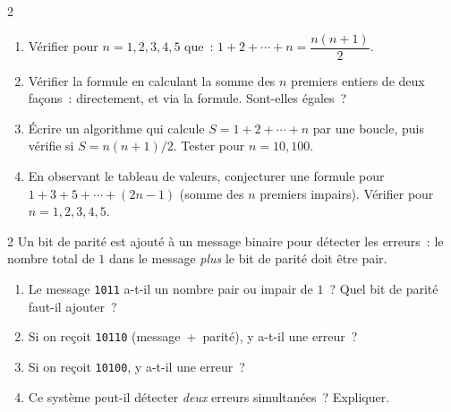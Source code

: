 \begin{probleme}{2}
\begin{enumerate}
  \item V\'erifier pour $n = 1, 2, 3, 4, 5$ que~:
        $1 + 2 + \cdots + n = \dfrac{n(n+1)}{2}.$
  \item V\'erifier la formule en calculant la somme des $n$ premiers entiers
        de deux fa\c cons~: directement, et via la formule.
        Sont-elles \'egales~?
  \item \'Ecrire un algorithme qui calcule $S = 1+2+\cdots+n$ par une boucle,
        puis v\'erifie si $S = n(n+1)/2$. Tester pour $n = 10, 100$.
  \item En observant le tableau de valeurs, conjecturer une formule
        pour $1 + 3 + 5 + \cdots + (2n-1)$ (somme des $n$ premiers impairs).
        V\'erifier pour $n = 1, 2, 3, 4, 5$.
\end{enumerate}
\end{probleme}

\begin{probleme}{2}
Un bit de parit\'e est ajout\'e \`a un message binaire pour d\'etecter les erreurs~:
le nombre total de $1$ dans le message \emph{plus} le bit de parit\'e doit \^etre pair.
\begin{enumerate}
  \item Le message \texttt{1011} a-t-il un nombre pair ou impair de $1$~?
        Quel bit de parit\'e faut-il ajouter~?
  \item Si on re\c coit \texttt{10110} (message~+~parit\'e), y a-t-il une erreur~?
  \item Si on re\c coit \texttt{10100}, y a-t-il une erreur~?
  \item Ce syst\`eme peut-il d\'etecter \emph{deux} erreurs simultan\'ees~?
        Expliquer.
\end{enumerate}
\end{probleme}

